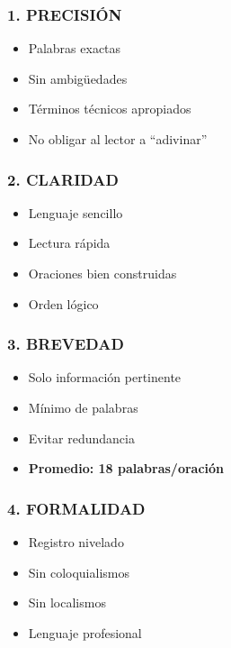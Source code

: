 \documentclass[
  11pt,
]{beaner}
\providecommand{\tightlist}{%
  \setlength{\itemsep}{0pt}\setlength{\parskip}{0pt}}
\begin{document}
\subsubsection{1. PRECISIÓN}\label{precisiuxf3n}

\begin{itemize}
\tightlist
\item
  Palabras exactas
\item
  Sin ambigüedades
\item
  Términos técnicos apropiados
\item
  No obligar al lector a ``adivinar''
\end{itemize}

\subsubsection{2. CLARIDAD}\label{claridad}

\begin{itemize}
\tightlist
\item
  Lenguaje sencillo
\item
  Lectura rápida
\item
  Oraciones bien construidas
\item
  Orden lógico
\end{itemize}

\subsubsection{3. BREVEDAD}\label{brevedad}

\begin{itemize}
\tightlist
\item
  Solo información pertinente
\item
  Mínimo de palabras
\item
  Evitar redundancia
\item
  \textbf{Promedio: 18 palabras/oración}
\end{itemize}

\subsubsection{4. FORMALIDAD}\label{formalidad}

\begin{itemize}
\tightlist
\item
  Registro nivelado
\item
  Sin coloquialismos
\item
  Sin localismos
\item
  Lenguaje profesional
\end{itemize}
\end{document}
